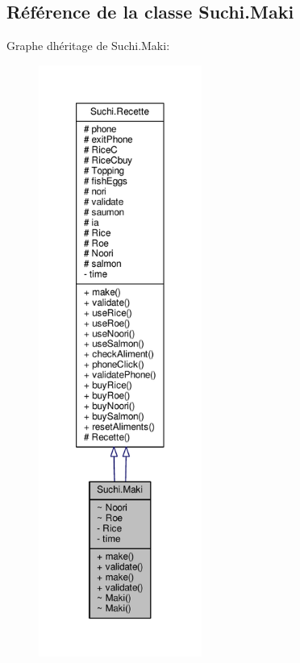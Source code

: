 \hypertarget{classSuchi_1_1Maki}{}\subsection{Référence de la classe Suchi.\+Maki}
\label{classSuchi_1_1Maki}


Graphe d\textquotesingle{}héritage de Suchi.\+Maki\+:\nopagebreak
\begin{figure}[H]
\begin{center}
\leavevmode
\includegraphics[height=550pt]{classSuchi_1_1Maki__inherit__graph}
\end{center}
\end{figure}


